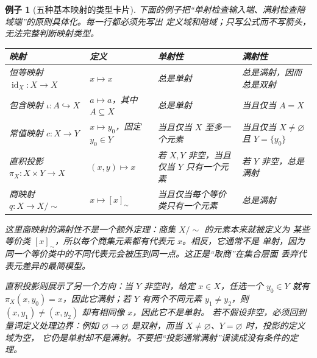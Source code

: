 \documentclass[UTF8,fontset=none,a4paper,11pt]{ctexart}
\theoremstyle{foundation-definition}
\theoremstyle{foundation-theorem}
\theoremstyle{foundation-proposition}
\theoremstyle{foundation-example}
\newtheorem{example}[definition]{例子}
\theoremstyle{foundation-remark}
\theoremstyle{foundation-theorem}
\begin{document}
\begin{example}[五种基本映射的类型卡片]
下面的例子把“单射检查输入端、满射检查陪域端”的原则具体化。每一行都必须先写出
定义域和陪域；只写公式而不写箭头，无法完整判断映射类型。

\begin{center}
\begin{tabularx}{\textwidth}{p{}p{}p{}X}
\toprule
映射 & 定义 & 单射性 & 满射性 \\
\midrule
恒等映射
\(\operatorname{id}_X:X\to X\)
& \(x\mapsto x\)
& 总是单射
& 总是满射，因而总是双射 \\
包含映射
\(\iota:A\hookrightarrow X\)
& \(a\mapsto a\)，其中 \(A\subseteq X\)
& 总是单射
& 当且仅当 \(A=X\) \\
常值映射
\(c:X\to Y\)
& \(x\mapsto y_0\)，固定 \(y_0\in Y\)
& 当且仅当 \(X\) 至多一个元素
& 当且仅当 \(X\ne\varnothing\) 且 \(Y=\{y_0\}\) \\
直积投影
\(\pi_X:X\times Y\to X\)
& \((x,y)\mapsto x\)
& 若 \(X,Y\) 非空，当且仅当 \(Y\) 只有一个元素
& 若 \(Y\) 非空，总是满射 \\
商映射
\(q:X\to X/{\sim}\)
& \(x\mapsto [x]_{\sim}\)
& 当且仅当每个等价类只有一个元素
& 总是满射 \\
\bottomrule
\end{tabularx}
\end{center}

这里商映射的满射性不是一个额外定理：商集 \(X/{\sim}\) 的元素本来就被定义为
某些等价类 \([x]_{\sim}\)，所以每个商集元素都有代表元 \(x\)。相反，它通常不是
单射，因为同一个等价类中的不同代表元会被压到同一点。这正是“取商”在集合层面
丢弃代表元差异的最简模型。

直积投影则展示了另一个方向：当 \(Y\) 非空时，给定 \(x\in X\)，任选一个
\(y_0\in Y\) 就有 \(\pi_X(x,y_0)=x\)，因此它满射；若 \(Y\) 有两个不同元素
\(y_1\ne y_2\)，则 \((x,y_1)\ne(x,y_2)\) 却有相同像 \(x\)，因此它不是单射。
若不假设非空，必须回到量词定义处理边界：例如 \(\varnothing\to\varnothing\)
是双射，而当 \(X\ne\varnothing\)、\(Y=\varnothing\) 时，投影的定义域为空，
它仍是单射却不是满射。不要把“投影通常满射”误读成没有条件的定理。
\end{example}
\end{document}
